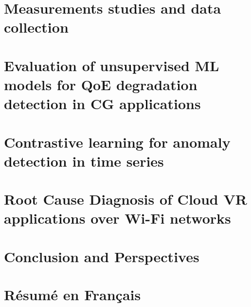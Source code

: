\documentclass[11pt, nofrench]{thesul}
\theoremstyle{definition}
\begin{document}
\chapter{Measurements studies and data collection}\label{chap:measurements}


\chapter{Evaluation of unsupervised ML models for QoE degradation detection in CG applications}\label{chap:ml_evaluation}


% 

\chapter{Contrastive learning for anomaly detection in time series}\label{chap:cats}


\chapter{Root Cause Diagnosis of Cloud VR applications over Wi-Fi networks}\label{chap:diagnosis}



\chapter*{Conclusion and Perspectives}\label{chap:conclusion}


\chapter*{Résumé en Français}\label{french_summary}




\end{document}
